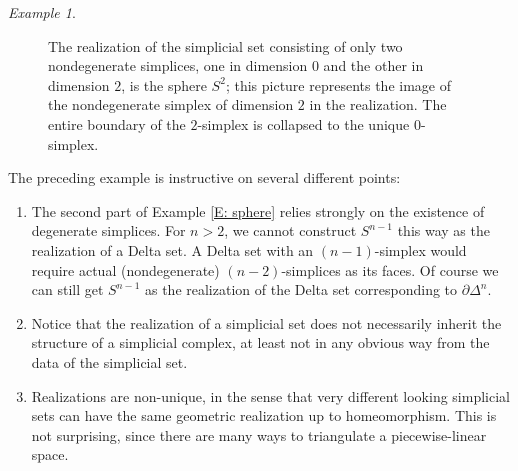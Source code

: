 \documentclass[12pt]{article}
\theoremstyle{plain}
\theoremstyle{definition}
\theoremstyle{remark}
\newtheorem{example}[theorem]{Example}
\newcommand{\bd}{\partial}
\begin{document}
\begin{example}
\begin{figure}[!htp]
\begin{center}
\end{center}
\caption{The realization of the simplicial set consisting of only two nondegenerate simplices, one in dimension $0$ and the other in dimension $2$, is the sphere $S^2$; this picture represents the image of the nondegenerate simplex of dimension $2$ in the realization. The entire boundary of the $2$-simplex is collapsed to the unique $0$-simplex. }\label{F: fig16}
\end{figure}


\end{example}

The preceding example is instructive on several different points:

\begin{enumerate}
\item The second part of Example \ref{E: sphere} relies strongly on the existence of degenerate simplices. For $n>2$, we cannot construct $S^{n-1}$ this way as the realization of a Delta set. A Delta set with an $(n-1)$-simplex would require actual (nondegenerate) $(n-2)$-simplices as its faces. Of course we can still get $S^{n-1}$ as the realization of the Delta set corresponding to $\bd \Delta^n$.  

\item Notice that the realization of a simplicial set does not necessarily inherit the structure of a simplicial complex, at least not in any obvious way from the data of the simplicial set. 

\item Realizations are non-unique, in the sense that very different looking simplicial sets can have the same geometric realization up to homeomorphism. This is not surprising, since there are many ways to triangulate a piecewise-linear space.

\end{enumerate}
\end{document}
